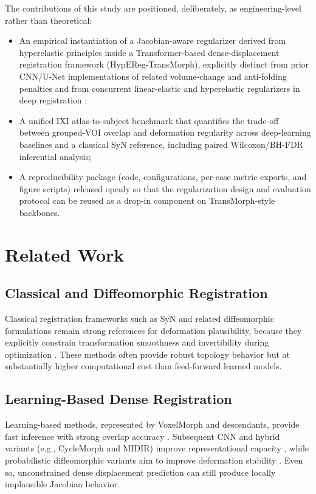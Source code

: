\documentclass[11pt,a4paper]{article}
\begin{document}
The contributions of this study are positioned, deliberately, as engineering-level rather than theoretical:
\begin{itemize}
\item An empirical instantiation of a Jacobian-aware regularizer derived from hyperelastic principles inside a Transformer-based dense-displacement registration framework (HypEReg-TransMorph), explicitly distinct from prior CNN/U-Net implementations of related volume-change and anti-folding penalties \citep{mok2020fast,hering2021lung} and from concurrent linear-elastic and hyperelastic regularizers in deep registration \citep{zou2023conformal,elasticmorph2025};
\item A unified IXI atlas-to-subject benchmark that quantifies the trade-off between grouped-VOI overlap and deformation regularity across deep-learning baselines and a classical SyN reference, including paired Wilcoxon/BH-FDR inferential analysis;
\item A reproducibility package (code, configurations, per-case metric exports, and figure scripts) released openly so that the regularization design and evaluation protocol can be reused as a drop-in component on TransMorph-style backbones.
\end{itemize}

\section{Related Work}

\subsection{Classical and Diffeomorphic Registration}
Classical registration frameworks such as SyN and related diffeomorphic formulations remain strong references for deformation plausibility, because they explicitly constrain transformation smoothness and invertibility during optimization \citep{avants2008ants,rueckert1999nonrigid,ashburner1999morphometry}. These methods often provide robust topology behavior but at substantially higher computational cost than feed-forward learned models.

\subsection{Learning-Based Dense Registration}
Learning-based methods, represented by VoxelMorph and descendants, provide fast inference with strong overlap accuracy \citep{balakrishnan2019voxelmorph}. Subsequent CNN and hybrid variants (e.g., CycleMorph and MIDIR) improve representational capacity \citep{kim2021cyclemorph,qiu2021midir}, while probabilistic diffeomorphic variants aim to improve deformation stability \citep{dalca2019probreg}. Even so, unconstrained dense displacement prediction can still produce locally implausible Jacobian behavior.
\end{document}
